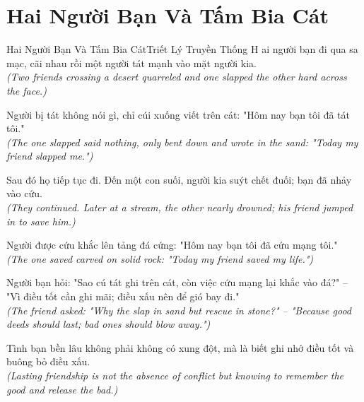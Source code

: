 \section{Hai Người Bạn Và Tấm Bia Cát}
\begin{truyen}{Hai Người Bạn Và Tấm Bia Cát}{Triết Lý Truyền Thống}
H ai người bạn đi qua sa mạc, cãi nhau rồi một người tát mạnh vào mặt người kia.\\
\textit{(Two friends crossing a desert quarreled and one slapped the other hard across the face.)}

Người bị tát không nói gì, chỉ cúi xuống viết trên cát: "Hôm nay bạn tôi đã tát tôi."\\
\textit{(The one slapped said nothing, only bent down and wrote in the sand: "Today my friend slapped me.")}

Sau đó họ tiếp tục đi. Đến một con suối, người kia suýt chết đuối; bạn đã nhảy vào cứu.\\
\textit{(They continued. Later at a stream, the other nearly drowned; his friend jumped in to save him.)}

Người được cứu khắc lên tảng đá cứng: "Hôm nay bạn tôi đã cứu mạng tôi."\\
\textit{(The one saved carved on solid rock: "Today my friend saved my life.")}

Người bạn hỏi: "Sao cú tát ghi trên cát, còn việc cứu mạng lại khắc vào đá?" -- "Vì điều tốt cần ghi mãi; điều xấu nên để gió bay đi."\\
\textit{(The friend asked: "Why the slap in sand but rescue in stone?" -- "Because good deeds should last; bad ones should blow away.")}

\end{truyen}
\begin{baihoc}
  Tình bạn bền lâu không phải không có xung đột, mà là biết ghi nhớ điều tốt và buông bỏ điều xấu.\\
  \textit{(Lasting friendship is not the absence of conflict but knowing to remember the good and release the bad.)}
\end{baihoc}

